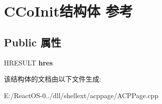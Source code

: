 \hypertarget{struct_c_co_init}{}\section{C\+Co\+Init结构体 参考}
\label{struct_c_co_init}
\subsection*{Public 属性}
\begin{DoxyCompactItemize}
\item 
\mbox{\label{struct_c_co_init_a1550e44e9fc6ff16c649da8b062b7059}} 
H\+R\+E\+S\+U\+LT {\bfseries hres}
\end{DoxyCompactItemize}


该结构体的文档由以下文件生成\+:\begin{DoxyCompactItemize}
\item 
E\+:/\+React\+O\+S-\/0../dll/shellext/acppage/A\+C\+P\+Page.\+cpp\end{DoxyCompactItemize}
